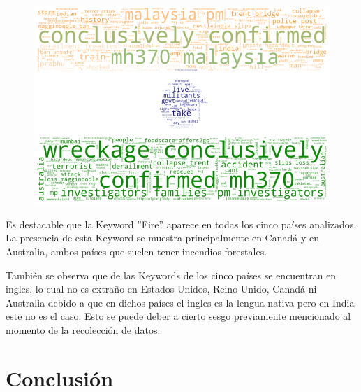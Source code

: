\documentclass[titlepage,a4paper]{article}
\begin{document}
    \begin{figure}[H]
    \centering
    \includegraphics[width=1\textwidth]{graficos/Analisis de Locacion/bandera_india.png}
    \caption{}
    \end{figure}
    
    
    Es destacable que la Keyword ''Fire'' aparece en todas los cinco países analizados. La presencia de esta Keyword se muestra principalmente en Canadá y en Australia, ambos países que suelen tener incendios forestales. 
    
    También se observa que de las Keywords de los cinco países se encuentran en ingles, lo cual no es extraño en Estados Unidos, Reino Unido, Canadá ni Australia debido a que en dichos países el ingles es la lengua nativa pero en India este no es el caso. Esto se puede deber a cierto sesgo previamente mencionado al momento de la recolección de datos. 

    \newpage
    \section{Conclusión}\label{sec:intro}
    
    
\end{document}
